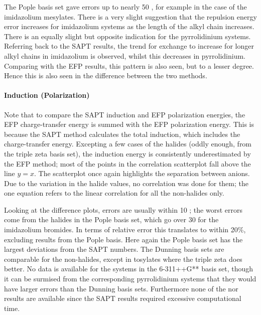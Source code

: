\begin{footnotesize}
The Pople basis set gave errors up to nearly 50 \enUnit, for example in the case of the imidazolium mesylates.
There is a very slight suggestion that the repulsion energy error increases for imidazolium systems as the length of the alkyl chain increases. 
There is an equally slight but opposite indication for the pyrrolidinium systems.
Referring back to the SAPT results, the trend for exchange to increase for longer alkyl chains in imidazolium is observed, whilst this decreases in pyrrolidinium. 
Comparing with the EFP results, this pattern is also seen, but to a lesser degree.
Hence this is also seen in the difference between the two methods.



\paragraph{Induction (Polarization)}
Note that to compare the SAPT induction and EFP polarization energies, the EFP charge-transfer energy is summed with the EFP polarization energy. 
This is because the SAPT method calculates the total induction, which includes the charge-transfer energy.
Excepting a few cases of the halides (oddly enough, from the triple zeta basis set), the induction energy is consistently underestimated by the EFP method; most of the points in the correlation scatterplot fall above the line $ y= x $.
The scatterplot once again highlights the separation between anions.
Due to the variation in the halide values, no correlation was done for them; the one equation refers to the linear correlation for all the non-halides only.

Looking at the difference plots, errors are usually within 10 \enUnit; the worst errors come from the halides in the Pople basis set, which go over 30 \enUnit for the imidazolium bromides.  
In terms of relative error this translates to within 20\%, excluding results from the Pople basis.
Here again the Pople basis set has the largest deviations from the SAPT numbers. 
The Dunning basis sets are comparable for the non-halides, except in tosylates where the triple zeta does better. 
No data is available for the  systems in the 6-311++G** basis set, though it can be surmised from the corresponding pyrrolidinium systems that they would have larger errors than the Dunning basis sets.
Furthermore none of the  nor  results are available since the SAPT results required excessive computational time.


\end{footnotesize}

